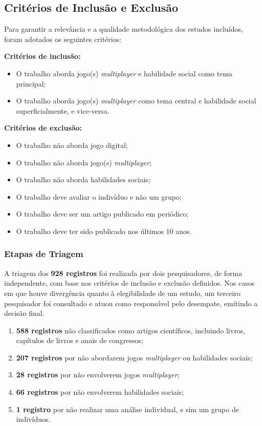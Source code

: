 \subsection{Critérios de Inclusão e Exclusão}

Para garantir a relevância e a qualidade metodológica dos estudos incluídos, foram adotados os seguintes critérios:

\textbf{Critérios de inclusão:}
\begin{itemize}
    \item O trabalho aborda jogo(s) \textit{multiplayer} e habilidade social como tema principal;
    \item O trabalho aborda jogo(s) \textit{multiplayer} como tema central e habilidade social superficialmente, e vice-versa.
\end{itemize}

\textbf{Critérios de exclusão:}
\begin{itemize}
    \item O trabalho não aborda jogo digital;
    \item O trabalho não aborda jogo(s) \textit{multiplayer};
    \item O trabalho não aborda habilidades sociais;
    \item O trabalho deve avaliar o indivíduo e não um grupo;
    \item O trabalho deve ser um artigo publicado em periódico;
    \item O trabalho deve ter sido publicado nos últimos 10 anos.
\end{itemize}

\subsubsection{Etapas de Triagem}


A triagem dos \textbf{928 registros} foi realizada por dois pesquisadores, de forma independente, com base nos critérios de inclusão e exclusão definidos. Nos casos em que houve divergência quanto à elegibilidade de um estudo, um terceiro pesquisador foi consultado e atuou como responsável pelo desempate, emitindo a decisão final.

\begin{enumerate}
     \item \textbf{588 registros} não classificados como artigos científicos, incluindo livros, capítulos de livros e anais de congressos;
    \item \textbf{207 registros} por não abordarem jogos \textit{multiplayer} ou habilidades sociais;
    \item \textbf{28 registros} por não envolverem jogos \textit{multiplayer};
    \item \textbf{66 registros} por não envolverem habilidades sociais;
    \item \textbf{1 registro} por não realizar uma análise individual, e sim um grupo de indivíduos.
\end{enumerate}

